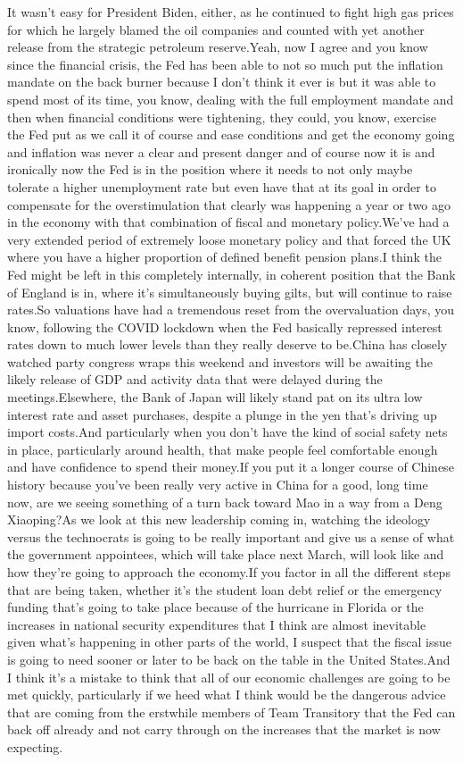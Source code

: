 \documentclass{article}%
\begin{document}
It wasn't easy for President Biden, either, as he continued to fight high gas prices for which he largely blamed the oil companies and counted with yet another release from the strategic petroleum reserve.Yeah, now I agree and you know since the financial crisis, the Fed has been able to not so much put the inflation mandate on the back burner because I don't think it ever is but it was able to spend most of its time, you know, dealing with the full employment mandate and then when financial conditions were tightening, they could, you know, exercise the Fed put as we call it of course and ease conditions and get the economy going and inflation was never a clear and present danger and of course now it is and ironically now the Fed is in the position where it needs to not only maybe tolerate a higher unemployment rate but even have that at its goal in order to compensate for the overstimulation that clearly was happening a year or two ago in the economy with that combination of fiscal and monetary policy.We've had a very extended period of extremely loose monetary policy and that forced the UK where you have a higher proportion of defined benefit pension plans.I think the Fed might be left in this completely internally, in coherent position that the Bank of England is in, where it's simultaneously buying gilts, but will continue to raise rates.So valuations have had a tremendous reset from the overvaluation days, you know, following the COVID lockdown when the Fed basically repressed interest rates down to much lower levels than they really deserve to be.China has closely watched party congress wraps this weekend and investors will be awaiting the likely release of GDP and activity data that were delayed during the meetings.Elsewhere, the Bank of Japan will likely stand pat on its ultra low interest rate and asset purchases, despite a plunge in the yen that's driving up import costs.And particularly when you don't have the kind of social safety nets in place, particularly around health, that make people feel comfortable enough and have confidence to spend their money.If you put it a longer course of Chinese history because you've been really very active in China for a good, long time now, are we seeing something of a turn back toward Mao in a way from a Deng Xiaoping?As we look at this new leadership coming in, watching the ideology versus the technocrats is going to be really important and give us a sense of what the government appointees, which will take place next March, will look like and how they're going to approach the economy.If you factor in all the different steps that are being taken, whether it's the student loan debt relief or the emergency funding that's going to take place because of the hurricane in Florida or the increases in national security expenditures that I think are almost inevitable given what's happening in other parts of the world, I suspect that the fiscal issue is going to need sooner or later to be back on the table in the United States.And I think it's a mistake to think that all of our economic challenges are going to be met quickly, particularly if we heed what I think would be the dangerous advice that are coming from the erstwhile members of Team Transitory that the Fed can back off already and not carry through on the increases that the market is now expecting.%
\end{document}
